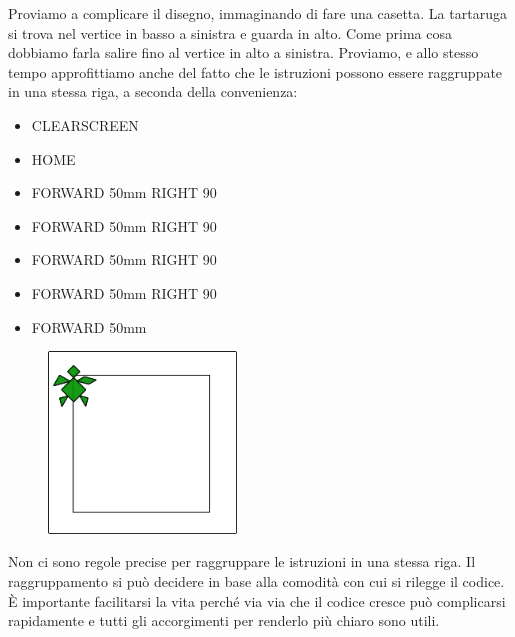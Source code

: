 Proviamo a complicare il disegno, immaginando di fare una casetta. La tartaruga si trova nel vertice in basso a sinistra e guarda in alto. Come prima cosa dobbiamo farla salire fino al vertice in alto a sinistra. Proviamo, e allo stesso tempo approfittiamo anche del fatto che le istruzioni possono essere raggruppate in una stessa riga, a seconda della convenienza:

\vskip 1cm

\begin{scriptsize}
\begin{minipage}{0.40\textwidth}
\begin{itemize}[itemsep=-3pt,parsep=2pt]
\item[] CLEARSCREEN             
\item[] HOME
\item[] FORWARD 50mm RIGHT 90
\item[] FORWARD 50mm RIGHT 90
\item[] FORWARD 50mm RIGHT 90
\item[] FORWARD 50mm RIGHT 90
\item[] FORWARD 50mm
\end{itemize}
\end{minipage}
\end{scriptsize}
\begin{minipage}{0.4\textwidth}
\begin{figure}[H]
   \includegraphics[width=5.0cm,trim=4 4 8 4,clip]{./images/disegnare/disegnare-5.png}
   \label{dis-5}
\end{figure}
\end{minipage} \hfill

\vskip 1cm

Non ci sono regole precise per raggruppare le istruzioni in una stessa riga. Il raggruppamento si può decidere in base alla comodità con cui si rilegge il codice. È importante facilitarsi la vita perché via via che il codice cresce può complicarsi rapidamente e tutti gli accorgimenti per renderlo più chiaro sono utili.

